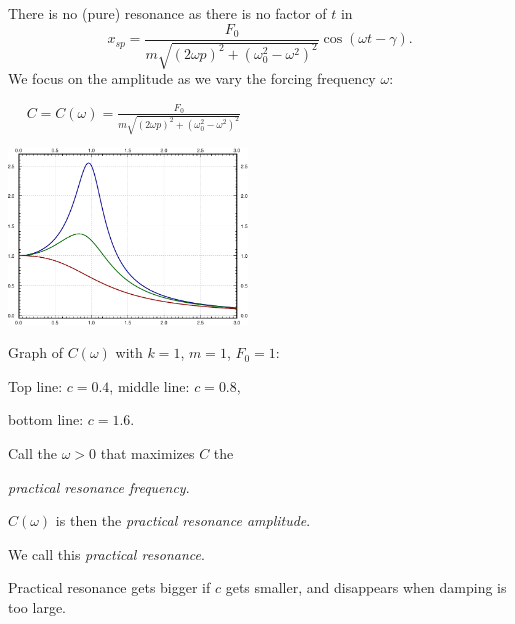 \documentclass[10pt,aspectratio=169]{beamer}
\begin{document}
\begin{frame}
There is no (pure) resonance as there is no factor of $t$ in
\[
x_{sp} = 
\frac{F_0}{m \sqrt{{(2\omega p)}^2+{(\omega_0^2-\omega^2)}^2}} 
\cos ( \omega t - \gamma ) .
\]
\pause
We focus on the amplitude as we vary the forcing frequency $\omega$:

\medskip

~~
$\displaystyle
C = C(\omega) =
\frac{F_0}{m \sqrt{{(2\omega p)}^2+{(\omega_0^2-\omega^2)}^2}} 
$
\pause
\vspace*{-0.5in}

\hfill
\includegraphics[width=2.5in]{../figures/3-6-pracres}

\vspace*{-1.3in}

Graph of $C(\omega)$ with $k=1$, $m=1$, $F_0 = 1$:

Top line: $c=0.4$, \quad
middle line: $c=0.8$,

bottom line: $c=1.6$.

\medskip
\pause

Call the $\omega > 0$ that maximizes $C$ the

\emph{practical resonance frequency}.

\medskip
\pause

$C(\omega)$ is then the
\emph{practical resonance amplitude}.

\medskip
\pause

We call this \emph{practical resonance}.

\medskip

Practical resonance gets bigger if $c$ gets smaller,
and disappears when damping is too large.
\end{frame}
\end{document}
